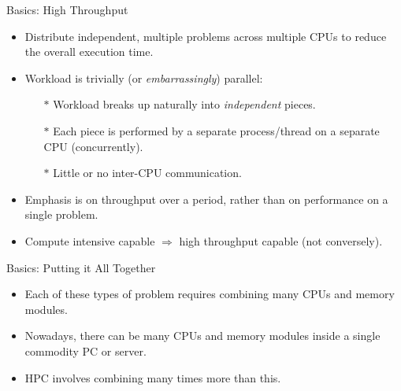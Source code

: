 \begin{frame}{Basics: High Throughput}
\begin{itemize}
\item{Distribute \alert{independent}, \alert{multiple problems} across multiple CPUs to reduce the overall execution time.}
\pause
\item{Workload is trivially (or \emph{embarrassingly}) parallel:}
\begin{itemize}
\item[$\ast$]{Workload breaks up naturally into \emph{independent} pieces.}
\item[$\ast$]{Each piece is performed by a separate process/thread on a separate CPU (concurrently).}
\item[$\ast$]{\alert{Little or no inter-CPU communication}.}
\end{itemize}
\pause
\item{Emphasis is on throughput over a period, rather than on performance on a single problem.}
\pause
\item{Compute intensive capable $\Rightarrow$ high throughput capable (not conversely).}
\end{itemize}
\end{frame}


\begin{frame}{Basics: Putting it All Together}
\begin{itemize}
\item{Each of these types of problem requires \alert{combining many CPUs and memory modules}.}
\pause
\item{Nowadays, there can be many CPUs and memory modules inside a \alert{single commodity PC or server}.}
  \pause
\item{HPC involves combining \alert{many times more than this}.}
\end{itemize}
\end{frame}
 

